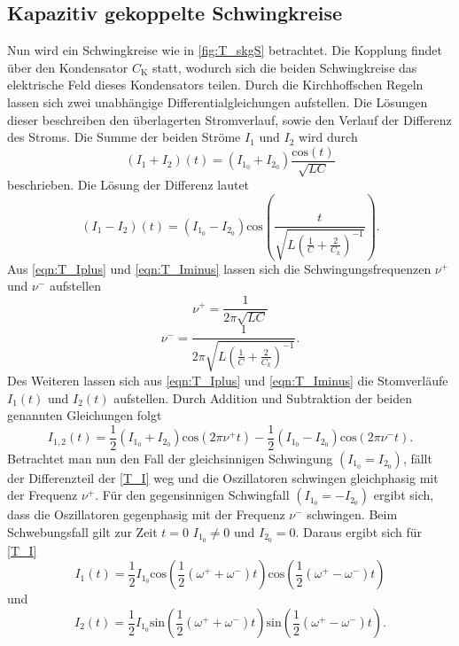 \subsection{Kapazitiv gekoppelte Schwingkreise}
\label{T_KgS}
Nun wird ein Schwingkreise wie in \autoref{fig:T_skgS} betrachtet. Die Kopplung findet über den Kondensator $C_\text{K}$ statt, wodurch sich die beiden Schwingkreise das elektrische Feld dieses Kondensators
teilen. Durch die Kirchhoffschen Regeln lassen sich zwei unabhängige Differentialgleichungen aufstellen. Die Lösungen dieser beschreiben den überlagerten Stromverlauf,
sowie den Verlauf der Differenz des Stroms.
Die Summe der beiden Ströme $I_1$ und $I_2$ wird durch 
\begin{equation}
    \label{eqn:T_Iplus}
    \left(I_1 + I_2\right)\left(t\right) = \left(I_{1_0} + I_{2_0}\right)\frac{\text{cos}\left(t\right)}{\sqrt{LC}}
\end{equation}
beschrieben. Die Lösung der Differenz lautet
\begin{equation}
    \label{eqn:T_Iminus}
    \left(I_1 - I_2\right)\left(t\right) = \left(I_{1_0} - I_{2_0}\right)\text{cos}\left(\frac{t}{\sqrt{L\left(\frac{1}{C}+\frac{2}{C_k}\right)^{-1}}}\right).
\end{equation}
Aus \autoref{eqn:T_Iplus} und \autoref{eqn:T_Iminus} lassen sich die Schwingungsfrequenzen $\nu^+$ und $\nu^-$ aufstellen
\begin{equation}
    \label{eqn:T_nup}
    \nu^+ = \frac{1}{2\pi\sqrt{LC}}
\end{equation}
\begin{equation}
    \label{eqn:T_num}
    \nu^- =  \frac{1}{2\pi\sqrt{L\left(\frac{1}{C}+\frac{2}{C_k}\right)^{-1}}}.
\end{equation}
Des Weiteren lassen sich aus \autoref{eqn:T_Iplus} und \autoref{eqn:T_Iminus} die Stomverläufe $I_1(t)$ und $I_2(t)$ aufstellen. Durch Addition und Subtraktion der beiden genannten Gleichungen 
folgt 
\begin{equation}
    \label{T_I}
    I_{1,2}(t) = \frac{1}{2}\left(I_{1_0} + I_{2_0}\right)\text{cos}\left(2\pi\nu^+ t\right) - \frac{1}{2}\left(I_{1_0} - I_{2_0}\right)\text{cos}\left(2\pi\nu^- t\right).
\end{equation}
Betrachtet man nun den Fall der gleichsinnigen Schwingung $\left(I_{1_0} = I_{2_0}\right)$, fällt der Differenzteil der \autoref{T_I} weg und die Oszillatoren schwingen gleichphasig mit der Frequenz 
$\nu^+$.
Für den gegensinnigen Schwingfall $\left(I_{1_0} = -I_{2_0}\right)$ ergibt sich, dass die Oszillatoren gegenphasig mit der Frequenz $\nu^-$ schwingen.
Beim Schwebungsfall gilt zur Zeit $t = 0$ $I_{1_0}\neq 0$ und $I_{2_0} = 0$. Daraus ergibt sich für \autoref{T_I} 
\begin{equation*}
    I_1(t) = \frac{1}{2} I_{1_0}\text{cos}\left(\frac{1}{2}(\omega^+ + \omega^-)t\right) \text{cos}\left(\frac{1}{2}(\omega^+ - \omega^-)t\right)
\end{equation*}
und
\begin{equation*}
    I_2(t) = \frac{1}{2} I_{1_0}\text{sin}\left(\frac{1}{2}(\omega^+ + \omega^-)t\right) \text{sin}\left(\frac{1}{2}(\omega^+ - \omega^-)t\right).
\end{equation*}


